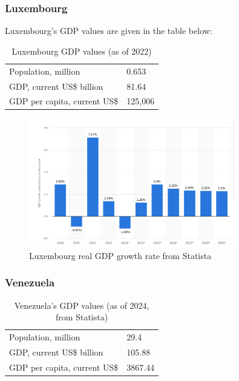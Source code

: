 \documentclass[12pt]{article}
\begin{document}
\subsubsection*{Luxembourg}

Luxembourg's GDP values are given in the table below: 

\begin{table}[H]
    \centering
    \begin{tabular}{l l} \hline
        Population, million & 0.653 \\ 
        GDP, current US\$ billion & 81.64 \\ 
        GDP per capita, current US\$ & 125,006 \\ \hline 
    \end{tabular}
    \caption{Luxembourg GDP values (as of 2022)}
    \label{5-luxgdp}
\end{table}

\begin{figure}[H]
    \centering
    \includegraphics[width=0.8\textwidth]{Images/luxembourggdp.png}
    \caption{Luxembourg real GDP growth rate from Statista}
    \label{fig:5-luxgdp}
\end{figure} 


\subsubsection*{Venezuela}

\begin{table}[H]
    \centering
    \begin{tabular}{l l} \hline
        Population, million & 29.4 \\ 
        GDP, current US\$ billion & 105.88 \\ 
        GDP per capita, current US\$ & 3867.44 \\ \hline 
    \end{tabular}
    \caption{Venezuela's GDP values (as of 2024, from Statista)}
    \label{5-vengdp}
\end{table}
\end{document}
